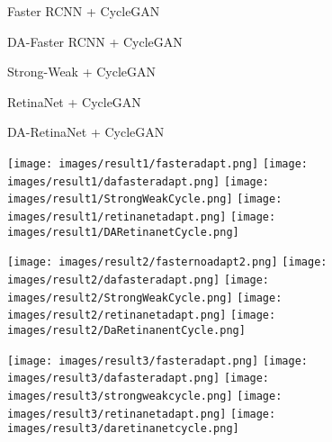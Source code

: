 \documentclass[preprint]{elsarticle}
\begin{document}
\begin{figure*}[t!]
            \centering
            \begin{minipage}{.19\textwidth}
            \centering
             Faster RCNN + CycleGAN\\
            \end{minipage}
            \begin{minipage}{.19\textwidth}
            \centering
             DA-Faster RCNN + CycleGAN\\
            \end{minipage}
            \begin{minipage}{.19\textwidth}
            \centering
             Strong-Weak + CycleGAN\\
            \end{minipage}
            \begin{minipage}{.19\textwidth}
            \centering
             RetinaNet + CycleGAN\\
            \end{minipage}
            \begin{minipage}{.19\textwidth}
            \centering
             DA-RetinaNet + CycleGAN\\
            \end{minipage}
            
            \vspace{1mm}
            \texttt{[image: images/result1/fasteradapt.png]}
            \texttt{[image: images/result1/dafasteradapt.png]}
            \texttt{[image: images/result1/StrongWeakCycle.png]}
            \texttt{[image: images/result1/retinanetadapt.png]}
            \texttt{[image: images/result1/DARetinanetCycle.png]}
            
            \vspace{1mm}
            \texttt{[image: images/result2/fasternoadapt2.png]}
            \texttt{[image: images/result2/dafasteradapt.png]}
            \texttt{[image: images/result2/StrongWeakCycle.png]}
            \texttt{[image: images/result2/retinanetadapt.png]}
            \texttt{[image: images/result2/DaRetinanentCycle.png]}
            
            \vspace{1mm}
            \texttt{[image: images/result3/fasteradapt.png]}
            \texttt{[image: images/result3/dafasteradapt.png]}
           \texttt{[image: images/result3/strongweakcycle.png]}
            \texttt{[image: images/result3/retinanetadapt.png]}
            \texttt{[image: images/result3/daretinanetcycle.png]}
            

\end{figure*}
\end{document}
